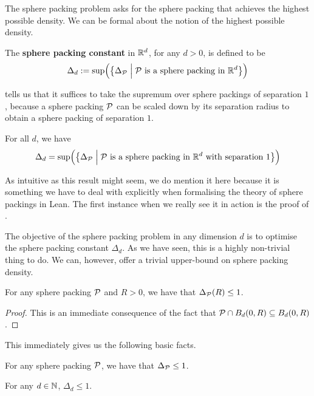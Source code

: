 The sphere packing problem asks for the sphere packing that achieves the highest possible density. We can be formal about the notion of the highest possible density.

\begin{boxdefinition}
    The \textbf{sphere packing constant} in $\mathbb{R}^d$, for any $d > 0$, is defined to be
    \begin{align*}
        \Delta_d := \sup\!\left( {\left\{ \Delta_{\mathcal{P}} \; \middle\vert \; \mathcal{P} \text{ is a sphere packing in } \mathbb{R}^d \right\}} \right)
    \end{align*}
\end{boxdefinition}

 tells us that it suffices to take the supremum over sphere packings of separation $1$, because a sphere packing $\mathcal{P}$ can be scaled down by its separation radius to obtain a sphere packing of separation $1$.

\begin{boxproposition}\label{Ch2:Prop:Scaling_Sphere_Packing_Constant}
    For all $d$, we have
    \begin{align*}
        \Delta_d = \sup\!\left( {\left\{ \Delta_{\mathcal{P}} \; \middle\vert \; \mathcal{P} \text{ is a sphere packing in } \mathbb{R}^d \text{ with separation } 1 \right\}} \right)
    \end{align*}
\end{boxproposition}

As intuitive as this result might seem, we do mention it here because it is something we have to deal with explicitly when formalising the theory of sphere packings in Lean. The first instance when we really see it in action is the proof of .

The objective of the sphere packing problem in any dimension $d$ is to optimise the sphere packing constant $\Delta_d$. As we have seen, this is a highly non-trivial thing to do. We can, however, offer a trivial upper-bound on sphere packing density.

\begin{boxlemma}
    For any sphere packing $\mathcal{P}$ and $R > 0$, we have that $\Delta_{\mathcal{P}}(R) \leq 1$.
\end{boxlemma}
\begin{proof}
    This is an immediate consequence of the fact that $\mathcal{P} \cap B_d(0, R) \subseteq B_d(0, R)$.
\end{proof}
This immediately gives us the following basic facts.
\begin{boxcorollary}
    For any sphere packing $\mathcal{P}$, we have that $\Delta_{\mathcal{P}} \leq 1$.
\end{boxcorollary}
\begin{boxcorollary}
    For any $d \in \mathbb{N}$, $\Delta_d \leq 1$.
\end{boxcorollary}

